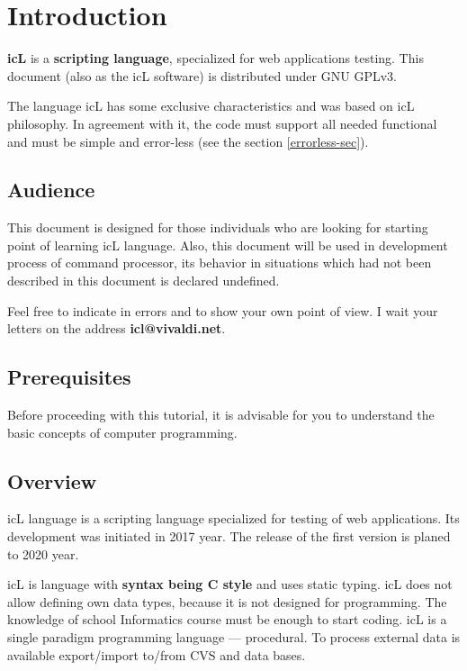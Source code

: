 \section{Introduction}

\indent \textbf{icL} is a \textbf{scripting language}, specialized for web applications testing. This document (also as the icL software) is distributed under GNU GPLv3.

The language icL has some exclusive characteristics and was based on icL philosophy. In agreement with it, the code must support all needed functional and must be simple and error-less (see the section \ref{errorless-sec}).

\subsection{Audience}

This document is designed for those individuals who are looking for starting point of learning icL language. Also, this document will be used in development process of command processor, its behavior in situations which had not been described in this document is declared undefined.

Feel free to indicate in errors and to show your own point of view. I wait your letters on the address {\bf icl@vivaldi.net}.

\subsection{Prerequisites}

Before proceeding with this tutorial, it is advisable for you to understand the basic concepts of computer programming.

\subsection{Overview}

icL language is a scripting language specialized for testing of web applications. Its development was initiated in 2017 year. The release of the first version is planed to 2020 year.

icL is language with \textbf{syntax being C style} and uses static typing. icL does not allow defining own data types, because it is not designed for programming. The knowledge of school Informatics course must be enough to start coding. icL is a single paradigm programming language — procedural. To process external data is available export/import to/from CVS and data bases.

